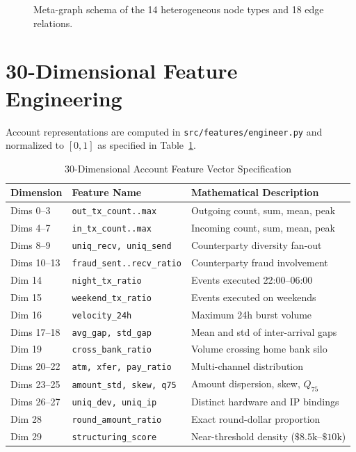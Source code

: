 \documentclass[conference]{IEEEtran}
\begin{document}
\begin{figure}[htbp]
\centering
{}
\caption{Meta-graph schema of the 14 heterogeneous node types and 18 edge relations.}
\label{fig:schema}
\end{figure}

\section{30-Dimensional Feature Engineering}
Account representations are computed in \texttt{src/features/engineer.py} and normalized to $[0, 1]$ as specified in Table~\ref{tab:features}.

\begin{table}[htbp]
\caption{30-Dimensional Account Feature Vector Specification}
\label{tab:features}
\centering
\begin{tabular}{@{}llp{4.6cm}@{}}
\toprule
\textbf{Dimension} & \textbf{Feature Name} & \textbf{Mathematical Description} \\
\midrule
Dims 0--3 & \texttt{out\_tx\_count..max} & Outgoing count, sum, mean, peak \\
Dims 4--7 & \texttt{in\_tx\_count..max} & Incoming count, sum, mean, peak \\
Dims 8--9 & \texttt{uniq\_recv, uniq\_send} & Counterparty diversity fan-out \\
Dims 10--13 & \texttt{fraud\_sent..recv\_ratio} & Counterparty fraud involvement \\
Dim 14 & \texttt{night\_tx\_ratio} & Events executed 22:00--06:00 \\
Dim 15 & \texttt{weekend\_tx\_ratio} & Events executed on weekends \\
Dim 16 & \texttt{velocity\_24h} & Maximum 24h burst volume \\
Dims 17--18 & \texttt{avg\_gap, std\_gap} & Mean and std of inter-arrival gaps \\
Dim 19 & \texttt{cross\_bank\_ratio} & Volume crossing home bank silo \\
Dims 20--22 & \texttt{atm, xfer, pay\_ratio} & Multi-channel distribution \\
Dims 23--25 & \texttt{amount\_std, skew, q75} & Amount dispersion, skew, $Q_{75}$ \\
Dims 26--27 & \texttt{uniq\_dev, uniq\_ip} & Distinct hardware and IP bindings \\
Dim 28 & \texttt{round\_amount\_ratio} & Exact round-dollar proportion \\
Dim 29 & \texttt{structuring\_score} & Near-threshold density ($\$8.5\text{k--}\$10\text{k}$) \\
\bottomrule
\end{tabular}
\end{table}
\end{document}
